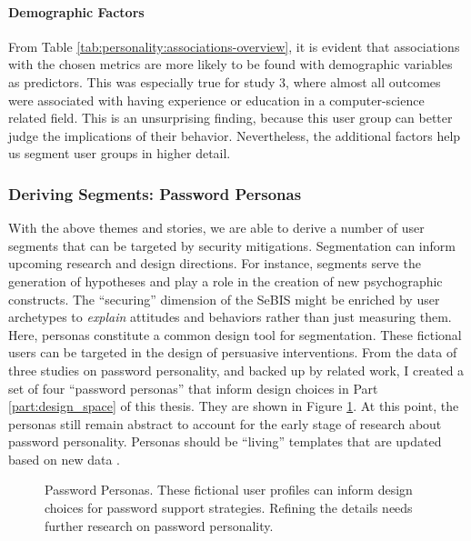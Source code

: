 \paragraph{Demographic Factors}
From Table \ref{tab:personality:associations-overview}, it is evident that associations with the chosen metrics are more likely to be found with demographic variables as predictors. This was especially true for study 3, where almost all outcomes were associated with having experience or education in a computer-science related field. This is an unsurprising finding, because this user group can better judge the implications of their behavior. Nevertheless, the additional factors help us segment user groups in higher detail. 

\subsubsection{Deriving Segments: Password Personas}\label{sec:personality:personas}
With the above themes and stories, we are able to derive a number of user segments that can be targeted by security mitigations. Segmentation can inform upcoming research and design directions. For instance, segments serve the generation of hypotheses and play a role in the creation of new psychographic constructs. The ``securing'' dimension of the \gls{SeBIS} might be enriched by user archetypes to \textit{explain} attitudes and behaviors rather than just measuring them. Here, \glspl{persona} constitute a common design tool for segmentation. These fictional users can be targeted in the design of persuasive interventions. From the data of three studies on password personality, and backed up by related work, I created a set of four ``password personas'' that inform design choices in Part \ref{part:design_space} of this thesis. They are shown in Figure \ref{fig:personality:personas}. At this point, the personas still remain abstract to account for the early stage of research about password personality. Personas should be ``living'' templates that are updated based on new data \cite{Gothelf2013LeanUX}. 

\begin{figure}[!htbp]
	\centering
	\caption{\label{fig:personality:personas} Password Personas. These fictional user profiles can inform design choices for password support strategies. Refining the details needs further research on password personality.}
\end{figure}


